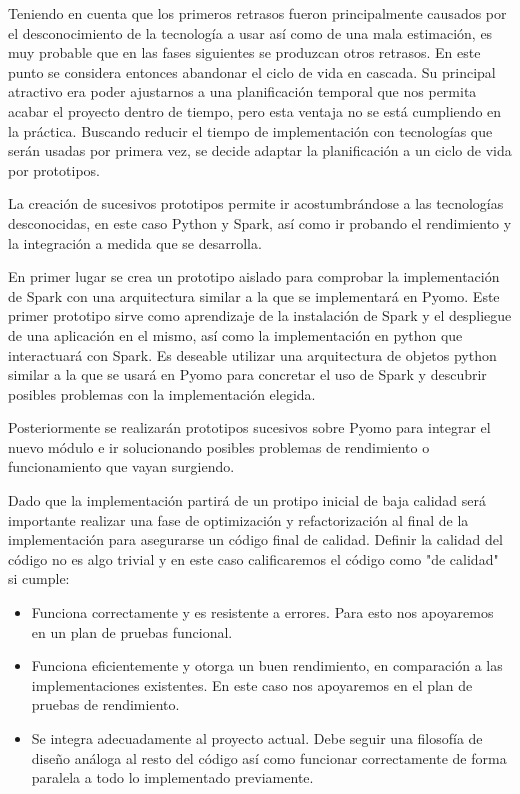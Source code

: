 Teniendo en cuenta que los primeros retrasos fueron principalmente causados por el desconocimiento de la tecnología a usar así como de una mala estimación, es muy probable que en las fases siguientes se produzcan otros retrasos. En este punto se considera entonces abandonar el ciclo de vida en cascada. Su principal atractivo era poder ajustarnos a una planificación temporal que nos permita acabar el proyecto dentro de tiempo, pero esta ventaja no se está cumpliendo en la práctica. Buscando reducir el tiempo de implementación con tecnologías que serán usadas por primera vez, se decide adaptar la planificación a un ciclo de vida por prototipos. 

La creación de sucesivos prototipos permite ir acostumbrándose a las tecnologías desconocidas, en este caso Python y Spark, así como ir probando el rendimiento y la integración a medida que se desarrolla.

En primer lugar se crea un prototipo aislado para comprobar la implementación de Spark con una arquitectura similar a la que se implementará en Pyomo. Este primer prototipo sirve como aprendizaje de la instalación de Spark y el despliegue de una aplicación en el mismo, así como la implementación en python que interactuará con Spark. Es deseable utilizar una arquitectura de objetos python similar a la que se usará en Pyomo para concretar el uso de Spark y descubrir posibles problemas con la implementación elegida.

Posteriormente se realizarán prototipos sucesivos sobre Pyomo para integrar el nuevo módulo e ir solucionando posibles problemas de rendimiento o funcionamiento que vayan surgiendo. 

Dado que la implementación partirá de un protipo inicial de baja calidad será importante realizar una fase de optimización y refactorización al final de la implementación para asegurarse un código final de calidad. Definir la calidad del código no es algo trivial y en este caso calificaremos el código como "de calidad" si cumple:

\begin{itemize}
    \item Funciona correctamente y es resistente a errores. Para esto nos apoyaremos en un plan de pruebas funcional.
    \item Funciona eficientemente y otorga un buen rendimiento, en comparación a las implementaciones existentes. En este caso nos apoyaremos en el plan de pruebas de rendimiento.
    \item Se integra adecuadamente al proyecto actual. Debe seguir una filosofía de diseño análoga al resto del código así como funcionar correctamente de forma paralela a todo lo implementado previamente.
\end{itemize}

